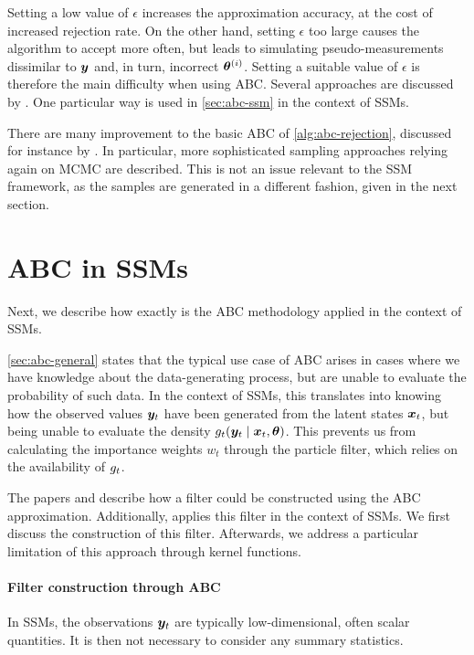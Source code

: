 Setting a low value of $\epsilon$ increases the approximation accuracy, at the cost of increased rejection rate. On the other hand, setting $\epsilon$ too large causes the algorithm to accept more often, but leads to simulating pseudo-measurements dissimilar to $\bm{y}$ and, in turn, incorrect $\bm{\theta}^{(i)}$. Setting a suitable value of $\epsilon$ is therefore the main difficulty when using ABC. Several approaches are discussed by \cite{jasra-filtering, jasra-time-series}. One particular way \citep{dedecius} is used in \autoref{sec:abc-ssm} in the context of SSMs.

There are many improvement to the basic ABC of \autoref{alg:abc-rejection}, discussed for instance by \cite{abc-recent}. In particular, more sophisticated sampling approaches relying again on MCMC are described. This is not an issue relevant to the SSM framework, as the samples are generated in a different fashion, given in the next section.

\section{ABC in SSMs} \label{sec:abc-ssm}
Next, we describe how exactly is the ABC methodology applied in the context of SSMs.

\autoref{sec:abc-general} states that the typical use case of ABC arises in cases where we have knowledge about the data-generating process, but are unable to evaluate the probability of such data. In the context of SSMs, this translates into knowing how the observed values $\bm{y}_t$ have been generated from the latent states $\bm{x}_t$, but being unable to evaluate the density $g_t(\bm{y}_t \mid \bm{x}_t, \bm{\theta})$. This prevents us from calculating the importance weights $w_t$ through the particle filter, which relies on the availability of $g_t$.

The papers \cite{tina-toni} and \cite{jasra-filtering} describe how a filter could be constructed using the ABC approximation. Additionally, \cite{jasra-time-series} applies this filter in the context of SSMs. We first discuss the construction of this filter. Afterwards, we address a particular limitation of this approach through kernel functions.

\paragraph{Filter construction through ABC}
In SSMs, the observations $\bm{y}_t$ are typically low-dimensional, often scalar quantities. It is then not necessary to consider any summary statistics.

